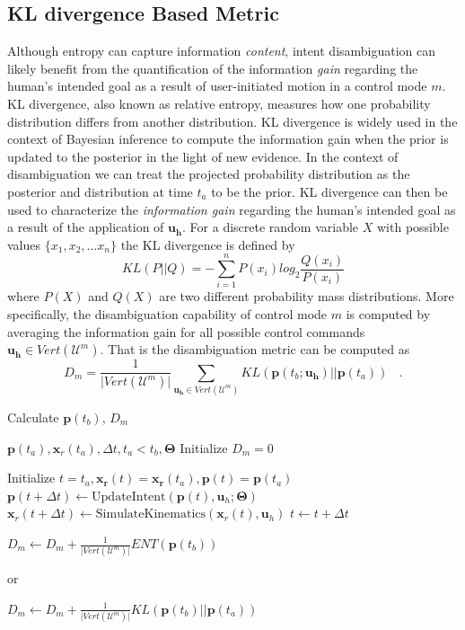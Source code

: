 \documentclass[conference]{IEEEtran}
\begin{document}
\subsection{KL divergence Based Metric}\label{sssec:kl}
Although entropy can capture information \textit{content}, intent disambiguation can likely benefit from the quantification of the information \textit{gain} regarding the human's intended goal as a result of user-initiated motion in a control mode $m$. 
KL divergence, also known as relative entropy, measures how one probability distribution differs from another distribution. KL divergence is widely used in the context of Bayesian inference to compute the information gain when the prior is updated to the posterior in the light of new evidence. In the context of disambiguation we can treat the projected probability distribution as the posterior and distribution at time $t_a$ to be the prior. KL divergence can then be used to characterize the \textit{information gain} regarding the human's intended goal as a result of the application of $\boldsymbol{u_h}$.
For a discrete random variable $X$ with possible values $\{x_1, x_2,\dots x_n\}$ the KL divergence is defined by
\begin{equation*}
KL(P||Q) = -\sum_{i=1}^{n}P(x_i)log_2\frac{Q(x_i)}{P(x_i)}
\end{equation*}
where $P(X)$ and $Q(X)$ are two different probability mass distributions. 
  More specifically, the disambiguation capability of control mode $m$ is computed by averaging the information gain for all possible control commands $\boldsymbol{u_h} \in Vert(\mathcal{U}^m)$. That is the disambiguation metric can be computed as 
\begin{equation*}
D_m = \frac{1}{\vert Vert(\mathcal{U}^m) \vert}\sum_{\boldsymbol{u_h} \in Vert(\mathcal{U}^m)} KL(\boldsymbol{p}(t_b; \boldsymbol{u_h})||\boldsymbol{p}(t_a))~~~~.
\end{equation*}
\begin{algorithm}[t]
	\caption{Calculate $\boldsymbol{p}(t_b)$, $D_m$}
	\label{alg:disamb}
	\begin{algorithmic}[1]
		\REQUIRE $\boldsymbol{p}(t_a), \boldsymbol{x}_r(t_a), \Delta t, t_a < t_b, \boldsymbol{\Theta}$
		\STATE Initialize $D_m = 0$
		
		\STATE Initialize $t = t_a, \boldsymbol{x_r}(t) = \boldsymbol{x_r}(t_a), \boldsymbol{p}(t) = \boldsymbol{p}(t_a)$
		\STATE $\boldsymbol{p}(t + \Delta t) \leftarrow \text{UpdateIntent}(\boldsymbol{p}(t), \boldsymbol{u}_h; \boldsymbol{\Theta})$
		\STATE $\boldsymbol{x}_r(t + \Delta t) \leftarrow \text{SimulateKinematics}(\boldsymbol{x}_r(t), \boldsymbol{u}_h)$
		\STATE $t \leftarrow t + \Delta t$
		\ENDWHILE
		
		\STATE $D_m \leftarrow D_m + \frac{1}{\vert Vert(\mathcal{U}^m) \vert} ENT(\boldsymbol{p}(t_b)) $
		
		or
		
		\STATE $D_m \leftarrow D_m + \frac{1}{\vert Vert(\mathcal{U}^m) \vert} KL(\boldsymbol{p}(t_b) \vert\vert \boldsymbol{p}(t_a)) $
		
		\ENDFOR
		\ENDFOR
	\end{algorithmic}
\end{algorithm}
\end{document}
